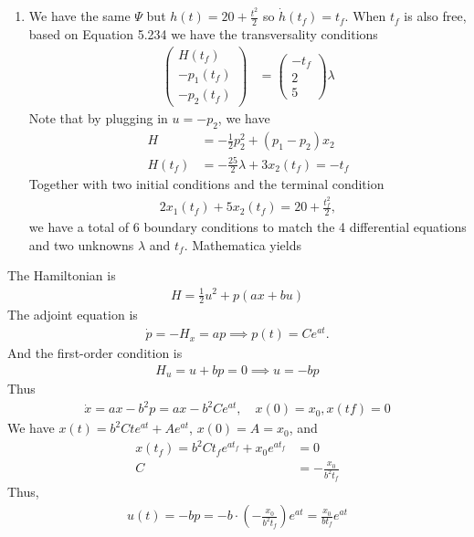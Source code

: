 \documentclass[12pt]{article}
\begin{document}
\begin{problem}[1]
\begin{enumerate}[label=(\alph*)]
\item We have the same $\Psi $ but $ h(t) = 20 +\frac{t^2}{ 2}$ so $ \dot{h}(t_f) = t_f$. When $ t_f$ is also free, based on Equation 5.234 we have the transversality conditions
\begin{align*}
	\begin{pmatrix} H(t_f)\\ -p_1(t_f)\\-p_2(t_f) \end{pmatrix} &= \begin{pmatrix} -t_f\\ 2\\5 \end{pmatrix} \lambda 
\end{align*}
Note that by plugging in $ u=-p_2$, we have
\begin{align*}
	H &= -\frac{1}{2} p_2^2+(p_1-p_2)x_2\\
	H(t_f)&= -\frac{25}{2} \lambda + 3x_2(t_f) = -t_f 
\end{align*}
Together with two initial conditions and the terminal condition
\begin{align*}
	2x_1(t_f) +5x_2(t_f) = 20 + \frac{t_f^2}{ 2},
\end{align*}
we have a total of 6 boundary conditions to match the 4 differential equations and two unknowns $ \lambda$ and $ t_f$. Mathematica yields
\end{enumerate}
\end{problem}
\begin{problem}[2]
The Hamiltonian is
\begin{align*}
	H = \frac{1}{2} u^2 + p(ax+bu)
\end{align*}
The adjoint equation is
\begin{align*}
	\dot{p} = -H_x = ap \implies p(t) = C e^{at}.
\end{align*}
And the first-order condition is
\begin{align*}
	H_u = u+bp = 0 \implies u=-bp
\end{align*}
Thus
\begin{align*}
	\dot{x} = ax-b^2p = ax - b^2 C e^{at}, \quad x(0)=x_0,x(tf) = 0
\end{align*}
We have $ x(t) = b^2 C t e^{at} + A e^{at}$, $ x(0) = A = x_0$, and
\begin{align*}
	x(t_f) = b^2 C t_f e^{at_f} + x_0 e^{at_f} &= 0 \\
	C &= - \frac{x_0}{ b^2 t_f}
\end{align*}
Thus,
\begin{align*}
	u(t) = -bp = -b \cdot \left( - \frac{x_0}{b^2 t_f} \right) e^{at}  = \frac{x_0}{ b t_f} e^{at}
\end{align*}
\end{problem}
\end{document}
